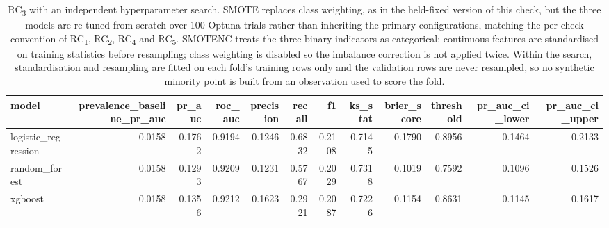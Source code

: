 \begin{table}[htbp]
\centering
\caption{RC\textsubscript{3} with an independent hyperparameter search. SMOTE replaces class weighting, as in the held-fixed version of this check, but the three models are re-tuned from scratch over 100 Optuna trials rather than inheriting the primary configurations, matching the per-check convention of RC\textsubscript{1}, RC\textsubscript{2}, RC\textsubscript{4} and RC\textsubscript{5}. SMOTENC treats the three binary indicators as categorical; continuous features are standardised on training statistics before resampling; class weighting is disabled so the imbalance correction is not applied twice. Within the search, standardisation and resampling are fitted on each fold's training rows only and the validation rows are never resampled, so no synthetic minority point is built from an observation used to score the fold.}
\label{tab:rc3_retuned}
\small
\begin{tabular}{lrrrrrrrrrrr}
\toprule
model & prevalence\_baseline\_pr\_auc & pr\_auc & roc\_auc & precision & recall & f1 & ks\_stat & brier\_score & threshold & pr\_auc\_ci\_lower & pr\_auc\_ci\_upper \\
\midrule
logistic\_regression & 0.0158 & 0.1762 & 0.9194 & 0.1246 & 0.6832 & 0.2108 & 0.7145 & 0.1790 & 0.8956 & 0.1464 & 0.2133 \\
random\_forest & 0.0158 & 0.1293 & 0.9209 & 0.1231 & 0.5767 & 0.2029 & 0.7318 & 0.1019 & 0.7592 & 0.1096 & 0.1526 \\
xgboost & 0.0158 & 0.1356 & 0.9212 & 0.1623 & 0.2921 & 0.2087 & 0.7226 & 0.1154 & 0.8631 & 0.1145 & 0.1617 \\
\bottomrule
\end{tabular}
\end{table}
